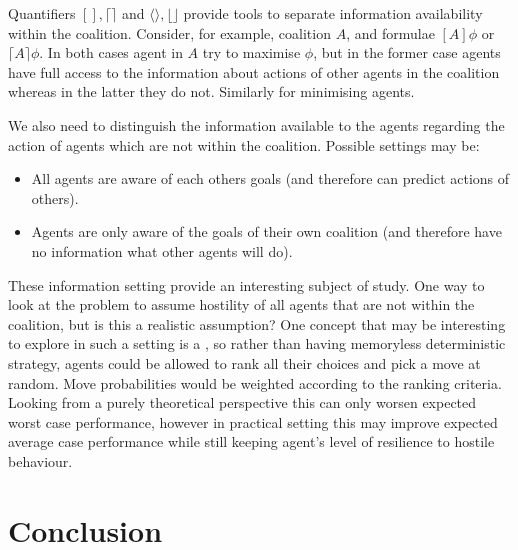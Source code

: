 \documentclass{llncs}
\begin{document}
\begin{remark}
Quantifiers $[], \lceil\rceil$ and $\langle\rangle, \lfloor \rfloor$ provide tools to separate information availability within the coalition. Consider, for example, coalition $A$, and formulae $[A]\phi$ or $\lceil A\rceil\phi$. In both cases agent in $A$ try to maximise $\phi$, but in the former case agents have full access to the information about actions of other agents in the coalition whereas in the latter they do not. Similarly for minimising agents.

We also need to distinguish the information available to the agents regarding the action of  agents which are not within the coalition. Possible settings may be:
\begin{itemize}
 \item All agents are aware of each others goals (and therefore can predict actions of others).
 \item Agents are only aware of the goals of their own coalition (and therefore have no information what other agents will do).
\end{itemize}

These information setting provide an interesting subject of study. One way to look at the problem to assume hostility of all agents that are not within the coalition, but is this a realistic assumption? One concept that may be interesting to explore in such a setting is a , so rather than having memoryless deterministic strategy, agents could be allowed to rank all their choices and pick a move at random. Move probabilities would be weighted according to the ranking criteria. Looking from a purely theoretical perspective this can only worsen expected worst case performance, however in practical setting this may improve expected average case performance while still keeping agent's level of resilience to hostile behaviour.

\end{remark}

\section{Conclusion}
\end{document}
